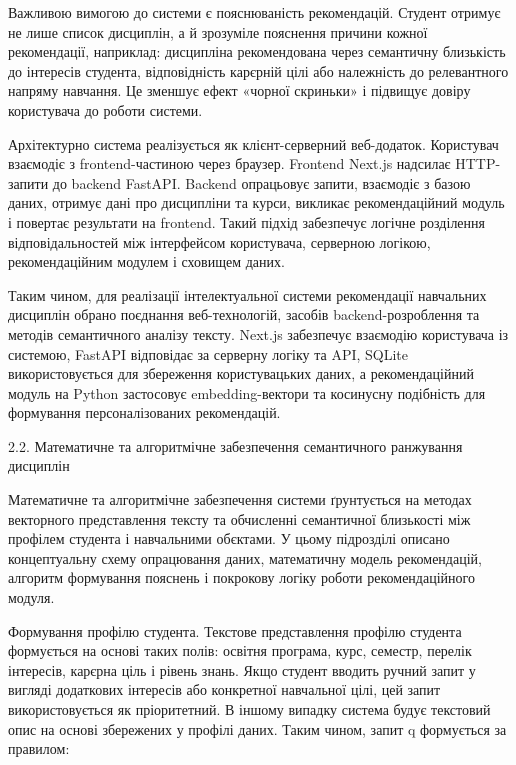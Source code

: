 \documentclass[
]{article}
\begin{document}
Важливою вимогою до системи є пояснюваність рекомендацій. Студент
отримує не лише список дисциплін, а й зрозуміле пояснення причини кожної
рекомендації, наприклад: дисципліна рекомендована через семантичну
близькість до інтересів студента, відповідність
кар\textquotesingle єрній цілі або належність до релевантного напряму
навчання. Це зменшує ефект «чорної скриньки» і підвищує довіру
користувача до роботи системи.

Архітектурно система реалізується як клієнт-серверний веб-додаток.
Користувач взаємодіє з frontend-частиною через браузер. Frontend Next.js
надсилає HTTP-запити до backend FastAPI. Backend опрацьовує запити,
взаємодіє з базою даних, отримує дані про дисципліни та курси, викликає
рекомендаційний модуль і повертає результати на frontend. Такий підхід
забезпечує логічне розділення відповідальностей між інтерфейсом
користувача, серверною логікою, рекомендаційним модулем і сховищем
даних.

Таким чином, для реалізації інтелектуальної системи рекомендації
навчальних дисциплін обрано поєднання веб-технологій, засобів
backend-розроблення та методів семантичного аналізу тексту. Next.js
забезпечує взаємодію користувача із системою, FastAPI відповідає за
серверну логіку та API, SQLite використовується для збереження
користувацьких даних, а рекомендаційний модуль на Python застосовує
embedding-вектори та косинусну подібність для формування
персоналізованих рекомендацій.

\protect{}\label{_Toc230434088}{}2.2. Математичне та
алгоритмічне забезпечення семантичного ранжування дисциплін

Математичне та алгоритмічне забезпечення системи ґрунтується на методах
векторного представлення тексту та обчисленні семантичної близькості між
профілем студента і навчальними об\textquotesingle єктами. У цьому
підрозділі описано концептуальну схему опрацювання даних, математичну
модель рекомендацій, алгоритм формування пояснень і покрокову логіку
роботи рекомендаційного модуля.

Формування профілю студента. Текстове представлення профілю студента
формується на основі таких полів: освітня програма, курс, семестр,
перелік інтересів, кар\textquotesingle єрна ціль і рівень знань. Якщо
студент вводить ручний запит у вигляді додаткових інтересів або
конкретної навчальної цілі, цей запит використовується як пріоритетний.
В іншому випадку система будує текстовий опис на основі збережених у
профілі даних. Таким чином, запит q формується за правилом:
\end{document}
